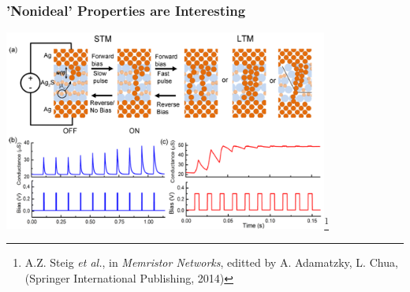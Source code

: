 \documentclass[mathserif]{beamer}
\begin{document}
\begin{frame}
\frametitle{'Nonideal' Properties are Interesting}

\begin{center}
\includegraphics[width=0.8\textwidth]{STM_LTP.png}\footnote{A.Z. Steig \emph{et al.}, in \emph{Memristor Networks}, editted by A. Adamatzky, L. Chua, (Springer International Publishing, 2014)}
\end{center}
\end{frame}
\end{document}
